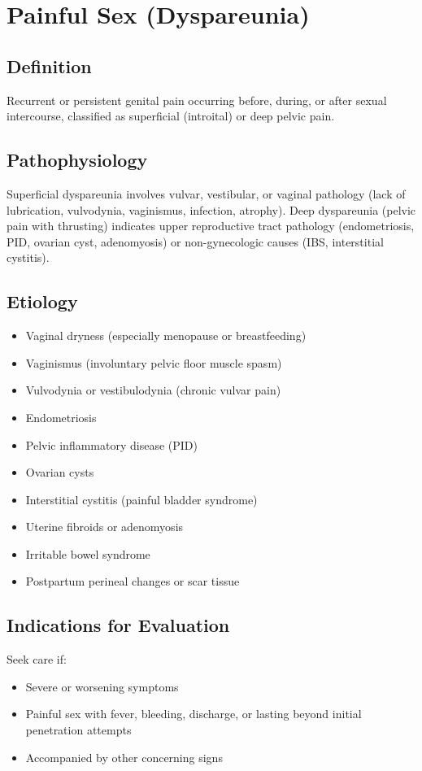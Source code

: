 \chapter{Painful Sex (Dyspareunia)}

\section*{Definition}
Recurrent or persistent genital pain occurring before, during, or after sexual intercourse, classified as superficial (introital) or deep pelvic pain.

\section*{Pathophysiology}
Superficial dyspareunia involves vulvar, vestibular, or vaginal pathology (lack of lubrication, vulvodynia, vaginismus, infection, atrophy). Deep dyspareunia (pelvic pain with thrusting) indicates upper reproductive tract pathology (endometriosis, PID, ovarian cyst, adenomyosis) or non-gynecologic causes (IBS, interstitial cystitis).

\section*{Etiology}
\begin{itemize}
  \item Vaginal dryness (especially menopause or breastfeeding)
  \item Vaginismus (involuntary pelvic floor muscle spasm)
  \item Vulvodynia or vestibulodynia (chronic vulvar pain)
  \item Endometriosis
  \item Pelvic inflammatory disease (PID)
  \item Ovarian cysts
  \item Interstitial cystitis (painful bladder syndrome)
  \item Uterine fibroids or adenomyosis
  \item Irritable bowel syndrome
  \item Postpartum perineal changes or scar tissue
\end{itemize}

\section*{Indications for Evaluation}
Seek care if:
\begin{itemize}
  \item Severe or worsening symptoms
  \item Painful sex with fever, bleeding, discharge, or lasting beyond initial penetration attempts
  \item Accompanied by other concerning signs
\end{itemize}

